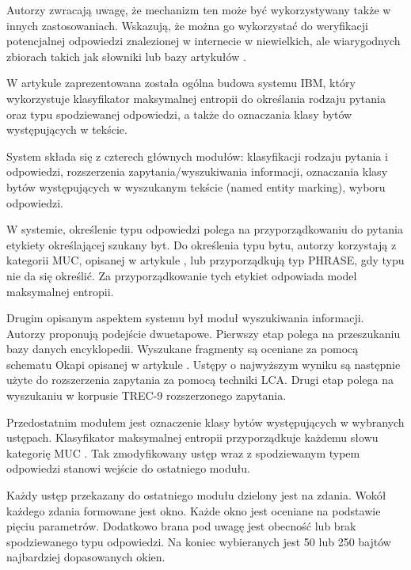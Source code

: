 Autorzy \cite{brill2001data} zwracają uwagę, że mechanizm ten może być wykorzystywany także w innych zastosowaniach. Wskazują, że można go wykorzystać do weryfikacji potencjalnej odpowiedzi znalezionej w internecie w niewielkich, ale wiarygodnych zbiorach takich jak słowniki lub bazy artykułów \cite{brill2001data}.

W artykule \cite{Ittycheriah00ibm'sstatistical} zaprezentowana została ogólna budowa systemu IBM, który wykorzystuje klasyfikator maksymalnej entropii do określania rodzaju pytania oraz typu spodziewanej odpowiedzi, a także do oznaczania klasy bytów występujących w tekście. 

System składa się z czterech głównych modułów: klasyfikacji rodzaju pytania i odpowiedzi, rozszerzenia zapytania/wyszukiwania informacji, oznaczania klasy bytów występujących w wyszukanym tekście (named entity marking), wyboru odpowiedzi. 

W systemie, określenie typu odpowiedzi polega na przyporządkowaniu do pytania etykiety określającej szukany byt. Do określenia typu bytu, autorzy korzystają z kategorii MUC, opisanej w artykule \cite{chinchor-robinson-1998-appendix}, lub przyporządkują typ PHRASE, gdy typu nie da się określić. Za przyporządkowanie tych etykiet odpowiada model maksymalnej entropii. 

Drugim opisanym aspektem systemu był moduł wyszukiwania informacji. Autorzy proponują podejście dwuetapowe. Pierwszy etap polega na przeszukaniu bazy danych encyklopedii. Wyszukane fragmenty są oceniane za pomocą schematu Okapi opisanej w artykule \cite{RobertsonOkapi}. Ustępy o najwyższym wyniku są następnie użyte do rozszerzenia zapytania za pomocą techniki LCA. Drugi etap polega na wyszukaniu w korpusie TREC-9 rozszerzonego zapytania.

Przedostatnim modułem jest oznaczenie klasy bytów występujących w wybranych ustępach. Klasyfikator maksymalnej entropii przyporządkuje każdemu słowu kategorię MUC \cite{chinchor-robinson-1998-appendix}. Tak zmodyfikowany ustęp wraz z spodziewanym typem odpowiedzi stanowi wejście do ostatniego modułu.

Każdy ustęp przekazany do ostatniego modułu dzielony jest na zdania. Wokół każdego zdania formowane jest okno. Każde okno jest oceniane na podstawie pięciu parametrów. Dodatkowo brana pod uwagę jest obecność lub brak spodziewanego typu odpowiedzi. Na koniec wybieranych jest 50 lub 250 bajtów najbardziej dopasowanych okien\cite{Ittycheriah00ibm'sstatistical}. 


